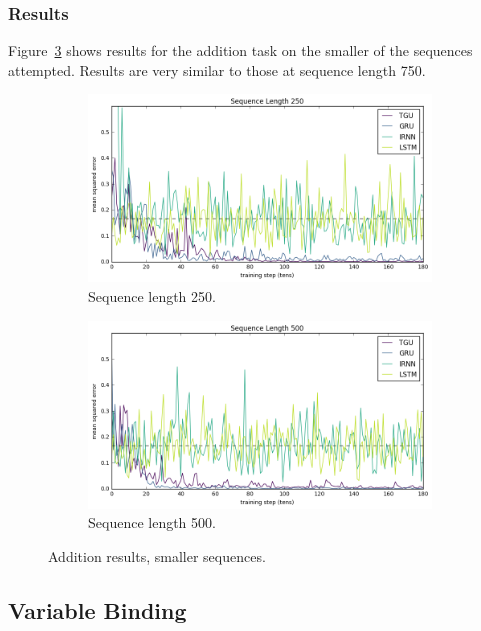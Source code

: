 \subsubsection{Results}
Figure~\ref{fig:addsmall} shows results for the addition task on the smaller of the sequences attempted.
Results are very similar to those at sequence length 750.
\begin{figure}
\centering
\begin{subfigure}[t]{0.75\textwidth}
\includegraphics[width=\textwidth]{exps/addition/sl250}
\caption{Sequence length 250.}
\label{fig:add250}
\end{subfigure}

\begin{subfigure}[t]{0.75\textwidth}
\includegraphics[width=\textwidth]{exps/addition/sl500}
\caption{Sequence length 500.}
\label{fig:add500}
\end{subfigure}
\caption{Addition results, smaller sequences.}
\label{fig:addsmall}
\end{figure}

\subsection{Variable Binding} \label{sec:vbinddata}

